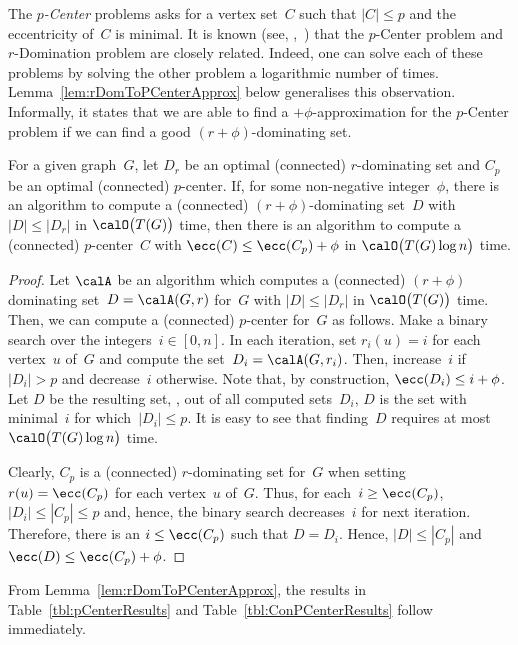 The \emph{\( p \)-Center} problems asks for a vertex set~$C$ such that $|C| \leq p$ and the eccentricity of~$C$ is minimal.
It is known (see, \eg,~\cite{BranChepDrag1998}) that the $p$-Center problem and $r$-Domination problem are closely related.
Indeed, one can solve each of these problems by solving the other problem a logarithmic number of times.
Lemma~\ref{lem:rDomToPCenterApprox} below generalises this observation.
Informally, it states that we are able to find a $+ \phi$-approximation for the $p$-Center problem if we can find a good $(r + \phi)$-dominating set.

\begin{lemma}
    \label{lem:rDomToPCenterApprox}
For a given graph~\( G \), let \( D_r \) be an optimal (connected) \( r \)-dominating set and \( C_p \) be an optimal (connected) \( p \)-center.
If, for some non-negative integer~\( \phi \), there is an algorithm to compute a (connected) \( (r + \phi) \)-dominating set~\( D \) with \( |D| \leq |D_r| \) in \( \calO \big( T(G) \big) \) time, then there is an algorithm to compute a (connected) \( p \)-center~\( C \) with \( \ecc(C) \leq \ecc(C_p) + \phi \) in \( \calO \big( T(G) \log n \big) \) time.
\end{lemma}

\begin{proof}
Let $\calA$ be an algorithm which computes a (connected) $(r + \phi)$ dominating set~$D = \calA(G, r)$ for~$G$ with $|D| \leq |D_r|$ in $\calO \big( T(G) \big)$ time.
Then, we can compute a (connected) $p$-center for~$G$ as follows.
Make a binary search over the integers~$i \in [0, n]$.
In each iteration, set $r_i(u) = i$ for each vertex~$u$ of~$G$ and compute the set~$D_i = \calA(G, r_i)$.
Then, increase~$i$ if $|D_i| > p$ and decrease~$i$ otherwise.
Note that, by construction, $\ecc(D_i) \leq i + \phi$.
Let $D$ be the resulting set, \ie, out of all computed sets~$D_i$, $D$ is the set with minimal~$i$ for which~$|D_i| \leq p$.
It is easy to see that finding~$D$ requires at most $\calO \big( T(G) \log n \big)$ time.

Clearly, $C_p$ is a (connected) $r$-dominating set for~$G$ when setting $r(u) = \ecc(C_p)$ for each vertex~$u$ of~$G$.
Thus, for each~$i \geq \ecc(C_p)$, $|D_i| \leq |C_p| \leq p$ and, hence, the binary search decreases~$i$ for next iteration.
Therefore, there is an $i \leq \ecc(C_p)$ such that $D = D_i$.
Hence, $|D| \leq |C_p|$ and $\ecc(D) \leq \ecc(C_p) + \phi$.
\end{proof}

From Lemma~\ref{lem:rDomToPCenterApprox}, the results in Table~\ref{tbl:pCenterResults} and Table~\ref{tbl:ConPCenterResults} follow immediately.

